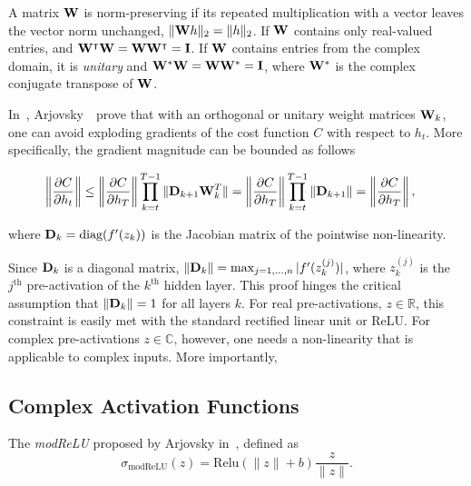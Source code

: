 \documentclass{article}
\begin{document}
A matrix $\mathbf{W}$ is norm-preserving if its repeated multiplication with a vector leaves the vector norm unchanged, \ie $\Vert \mathbf{W} h\Vert_{2} = \Vert h \Vert_2$.  If $\mathbf{W}$ contains only real-valued entries, and $\mathbf{W}^\intercal \mathbf{W} =  \mathbf{W} \mathbf{W}^\intercal = \mathbf{I}$.  If $\mathbf{W}$ contains entries from the complex domain, it is \emph{unitary} and $\mathbf{W}^* \mathbf{W} = \mathbf{W} \mathbf{W}^* = \mathbf{I}$, where $\mathbf{W}^*$ is the complex conjugate transpose of $\mathbf{W}$.  

In~\cite{Arjovsky}, Arjovsky~\etal~prove that with an orthogonal or unitary weight matrices $\mathbf{W}_k$, one can avoid exploding gradients of the cost function $C$ with respect to $h_t$.  More specifically, the gradient magnitude can be bounded as follows

\begin{align}\label{eq:gradbound}
        \left\Vert\frac{\partial C}{\partial h_t}\right\Vert & \leq   \left\Vert\frac{\partial C}{\partial h_T}\right\Vert \prod_{k=t}^{T-1}\Vert \mathbf{D}_{k+1} \mathbf{W} _k^T \Vert 
       =  \left\Vert\frac{\partial C}{\partial h_T}\right\Vert \prod_{k=t}^{T-1}\Vert \mathbf{D}_{k+1} \Vert  =  \left\Vert\frac{\partial C}{\partial h_T}\right\Vert,
\end{align}

where $\mathbf{D}_k = \text{diag}(f'(z_{k}))$ is the Jacobian matrix of the pointwise non-linearity.

Since $\mathbf{D}_k$ is a diagonal matrix, $\Vert\mathbf{D}_k\Vert = \max_{j=1,...,n} |f'(z_k^{(j)})|$, where $z_k^{(j)}$ is the $j^{\text{th}}$ pre-activation of the $k^{\text{th}}$ hidden layer.  This proof hinges the critical assumption that $\Vert\mathbf{D}_k\Vert = 1$ for all layers $k$.  For real pre-activations, \ie $z \in \mathbb{R}$, this constraint is easily met with the standard rectified linear unit or ReLU.  For complex pre-activations $z \in \mathbb{C}$, however, one needs a non-linearity that is applicable to complex inputs. More importantly, 

\subsection{Complex Activation Functions}
The \emph{modReLU} proposed by Arjovsky \etal in~\cite{Arjovsky}, defined as 
\begin{equation}
\sigma_{\text{modReLU}}(z) = \text{Relu}(\|z\| + b) \frac{z}{\|z\|}.
\end{equation}
\end{document}
